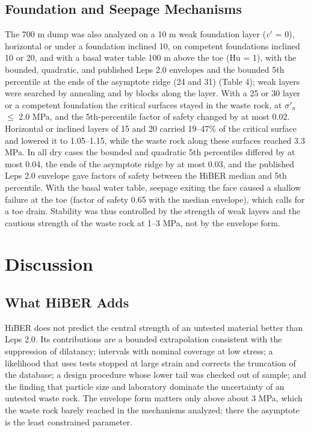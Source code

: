 \documentclass[Journal,letterpaper]{ascelike-new}
\begin{document}
\subsection{Foundation and Seepage Mechanisms}
The 700 m dump was also analyzed on a 10 m weak foundation layer (\textit{c}$'$ = 0), horizontal or under a foundation inclined 10\textdegree{}, on competent foundations inclined 10\textdegree{} or 20\textdegree{}, and with a basal water table 100 m above the toe (Hu = 1), with the bounded, quadratic, and published Leps 2.0 envelopes and the bounded 5th percentile at the ends of the asymptote ridge (24\textdegree{} and 31\textdegree{}) (Table 4); weak layers were searched by annealing and by blocks along the layer. With a 25\textdegree{} or 30\textdegree{} layer or a competent foundation the critical surfaces stayed in the waste rock, at $\sigma'_n$ $\le$ 2.0 MPa, and the 5th-percentile factor of safety changed by at most 0.02. Horizontal or inclined layers of 15\textdegree{} and 20\textdegree{} carried 19--47\% of the critical surface and lowered it to 1.05--1.15, while the waste rock along these surfaces reached 3.3 MPa. In all dry cases the bounded and quadratic 5th percentiles differed by at most 0.04, the ends of the asymptote ridge by at most 0.03, and the published Leps 2.0 envelope gave factors of safety between the HiBER median and 5th percentile. With the basal water table, seepage exiting the face caused a shallow failure at the toe (factor of safety 0.65 with the median envelope), which calls for a toe drain. Stability was thus controlled by the strength of weak layers and the cautious strength of the waste rock at 1--3 MPa, not by the envelope form.

\section{Discussion}
\subsection{What HiBER Adds}
HiBER does not predict the central strength of an untested material better than Leps 2.0. Its contributions are a bounded extrapolation consistent with the suppression of dilatancy; intervals with nominal coverage at low stress; a likelihood that uses tests stopped at large strain and corrects the truncation of the database; a design procedure whose lower tail was checked out of sample; and the finding that particle size and laboratory dominate the uncertainty of an untested waste rock. The envelope form matters only above about 3 MPa, which the waste rock barely reached in the mechanisms analyzed; there the asymptote is the least constrained parameter.
\end{document}

